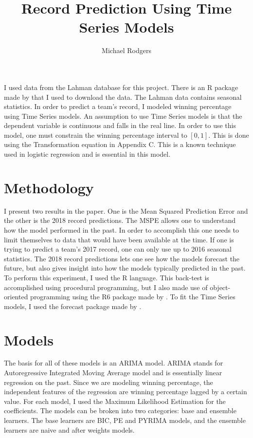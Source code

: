 \documentclass[12pt,a4paper,man,natbib]{apa6}
\title{\large{Record Prediction Using Time Series Models}}
\author{Michael Rodgers}
\affiliation{SMGT 430, Rice University}
\begin{document}
\maketitle

I used data from the Lahman database for this project. There 
is an R package made by \cite{lahman} that I used to 
download the data. The Lahman data contains seasonal 
statistics. In order to predict a team's record, I modeled 
winning percentage using Time Series models. An assumption 
to use Time Series models is that the dependent variable is 
continuous and falls in the real line. In order to use this 
model, one must constrain the winning percentage interval to 
$[0, 1]$. This is done using the Transformation equation in 
Appendix C. This is a known technique used in logistic 
regression and is essential in this model.

\section{Methodology}

I present two results in the paper. One is the Mean Squared 
Prediction Error and the other is the 2018 record 
predictions. The MSPE allows one to understand how the model 
performed in the past. In order to accomplish this one needs 
to limit themselves to data that would have been available 
at the time. If one is trying to predict a team's 2017 
record, one can only use up to 2016 seasonal statistics. The 
2018 record predictions lets one see how the models forecast 
the future, but also gives insight into how the models 
typically predicted in the past. To perform this experiment, 
I used the R language. This back-test is accomplished using 
procedural programming, but I also made use of object-
oriented programming using the R6 package made by \cite{R6}. 
To fit the Time Series models, I used the forecast package 
made by \cite{forecast}.

\newpage

\section{Models}

The basis for all of these models is an ARIMA model. ARIMA 
stands for Autoregressive Integrated Moving Average model 
and is essentially linear regression on the past. Since 
we are modeling winning percentage, the independent features 
of the regression are winning percentage lagged by a certain 
value. For each model, I used the Maximum Likelihood 
Estimation for the coefficients. The models can be broken 
into two categories: base and ensemble learners. The base 
learners are BIC, PE and PYRIMA models, and the ensemble 
learners are naive and after weights models. 
\end{document}
